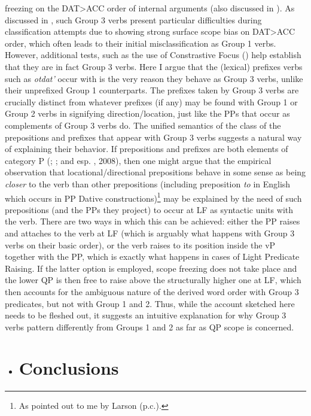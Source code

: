 \documentclass[output=paper,modfonts, nonflat]{langsci/langscibook}
\begin{document}
\begin{styleinnerExample}
freezing on the DAT>ACC order of internal arguments (also discussed in \citealt{BonehNash2017}). As discussed in \citet{Antonyuk2015}, such Group 3 verbs present particular difficulties during classification attempts due to showing strong surface scope bias on DAT>ACC order, which often leads to their initial misclassification as Group 1 verbs. However, additional tests, such as the use of Constrastive Focus (\citealt{AntonyukLarson2016}) help establish that they are in fact Group 3 verbs. Here I argue that the (lexical) prefixes verbs such as \textit{otdat'} occur with is the very reason they behave as Group 3 verbs, unlike their unprefixed Group 1 counterparts. The prefixes taken by Group 3 verbs are crucially distinct from whatever prefixes (if any) may be found with Group 1 or Group 2 verbs in signifying direction/location, just like the PPs that occur as complements of Group 3 verbs do. The unified semantics of the class of the prepositions and prefixes that appear with Group 3 verbs suggests a natural way of explaining their behavior. If prepositions and prefixes are both elements of category P (\citealt{Matushansky2002}; \citealt{Biskup2017}; and esp. \citealt{Svenonius2004}, 2008), then one might argue that the empirical observation that locational/directional prepositions behave in some sense as being \textit{closer} to the verb than other prepositions (including preposition \textit{to} in English which occurs in PP Dative constructions)\footnote{As pointed out to me by Larson (p.c.).} may be explained by the need of such prepositions (and the PPs they project) to occur at LF as syntactic units with the verb. There are two ways in which this can be achieved: either the PP raises and attaches to the verb at LF (which is arguably what happens with Group 3 verbs on their basic order), or the verb raises to its position inside the vP together with the PP, which is exactly what happens in cases of Light Predicate Raising. If the latter option is employed, scope freezing does not take place and the lower QP is then free to raise above the structurally higher one at LF, which then accounts for the ambiguous nature of the derived word order with Group 3 predicates, but not with Group 1 and 2. Thus, while the account sketched here needs to be fleshed out, it suggests an intuitive explanation for why Group 3 verbs pattern differently from Groups 1 and 2 as far as QP scope is concerned.

\begin{itemize}
\item \section{Conclusions}
\end{itemize}


\end{styleinnerExample}
\end{document}
